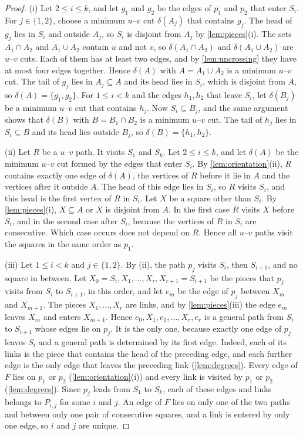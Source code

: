 \begin{proof}
(i) Let $2 \leq i \leq k$, and let $g_1$ and $g_2$ be the edges of $p_1$ and $p_2$ that enter $S_i$.
For $j \in \{1, 2\}$, choose a minimum $u$--$v$ cut $\delta(A_j)$ that contains $g_j$.
The head of $g_j$ lies in $S_i$ and outside $A_j$, so $S_i$ is disjoint from $A_j$ by \cref{lem:pieces}(i).
The sets $A_1 \cap A_2$ and $A_1 \cup A_2$ contain $u$ and not $v$, so $\delta(A_1 \cap A_2)$ and $\delta(A_1 \cup A_2)$ are $u$--$v$ cuts.
Each of them has at least two edges, and by \cref{lem:uncrossing} they have at most four edges together.
Hence $\delta(A)$ with $A = A_1 \cup A_2$ is a minimum $u$--$v$ cut.
The tail of $g_j$ lies in $A_j \subseteq A$ and its head lies in $S_i$, which is disjoint from $A$, so $\delta(A) = \{g_1, g_2\}$.
For $1 \leq i < k$ and the edges $h_1, h_2$ that leave $S_i$, let $\delta(B_j)$ be a minimum $u$--$v$ cut that contains $h_j$.
Now $S_i \subseteq B_j$, and the same argument shows that $\delta(B)$ with $B = B_1 \cap B_2$ is a minimum $u$--$v$ cut.
The tail of $h_j$ lies in $S_i \subseteq B$ and its head lies outside $B_j$, so $\delta(B) = \{h_1, h_2\}$.

(ii) Let $R$ be a $u$--$v$ path.
It visits $S_1$ and $S_k$.
Let $2 \leq i \leq k$, and let $\delta(A)$ be the minimum $u$--$v$ cut formed by the edges that enter $S_i$.
By \cref{lem:orientation}(ii), $R$ contains exactly one edge of $\delta(A)$, the vertices of $R$ before it lie in $A$ and the vertices after it outside $A$.
The head of this edge lies in $S_i$, so $R$ visits $S_i$, and this head is the first vertex of $R$ in $S_i$.
Let $X$ be a square other than $S_i$.
By \cref{lem:pieces}(i), $X \subseteq A$ or $X$ is disjoint from $A$.
In the first case $R$ visits $X$ before $S_i$, and in the second case after $S_i$, because the vertices of $R$ in $S_i$ are consecutive.
Which case occurs does not depend on $R$.
Hence all $u$--$v$ paths visit the squares in the same order as $p_1$.

(iii) Let $1 \leq i < k$ and $j \in \{1, 2\}$.
By (ii), the path $p_j$ visits $S_i$, then $S_{i+1}$, and no square in between.
Let $X_0 = S_i, X_1, \dots, X_r, X_{r+1} = S_{i+1}$ be the pieces that $p_j$ visits from $S_i$ to $S_{i+1}$, in this order, and let $e_m$ be the edge of $p_j$ between $X_m$ and $X_{m+1}$.
The pieces $X_1, \dots, X_r$ are links, and by \cref{lem:pieces}(iii) the edge $e_m$ leaves $X_m$ and enters $X_{m+1}$.
Hence $e_0, X_1, e_1, \dots, X_r, e_r$ is a general path from $S_i$ to $S_{i+1}$ whose edges lie on $p_j$.
It is the only one, because exactly one edge of $p_j$ leaves $S_i$ and a general path is determined by its first edge.
Indeed, each of its links is the piece that contains the head of the preceding edge, and each further edge is the only edge that leaves the preceding link (\cref{lem:degrees}).
Every edge of $F$ lies on $p_1$ or $p_2$ (\cref{lem:orientation}(i)) and every link is visited by $p_1$ or $p_2$ (\cref{lem:degrees}).
Since $p_j$ leads from $S_1$ to $S_k$, each of these edges and links belongs to $P_{i,j}$ for some $i$ and $j$.
An edge of $F$ lies on only one of the two paths and between only one pair of consecutive squares, and a link is entered by only one edge, so $i$ and $j$ are unique.


\end{proof}
